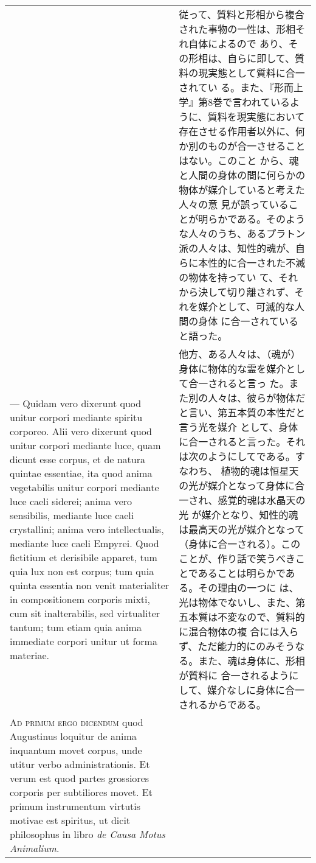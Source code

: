 \documentclass[paper=a4paper,fontsize=10pt,jafontsize=9pt,titlepage]{jlreq}
\begin{document}
\begin{longtable}{p{21em}p{21em}}
&

 従って、質料と形相から複合された事物の一性は、形相それ自体によるので
 あり、その形相は、自らに即して、質料の現実態として質料に合一されてい
 る。また、『形而上学』第8巻で言われているように、質料を現実態において
 存在させる作用者以外に、何か別のものが合一させることはない。このこと
 から、魂と人間の身体の間に何らかの物体が媒介していると考えた人々の意
 見が誤っていることが明らかである。そのような人々のうち、あるプラトン
 派の人々は、知性的魂が、自らに本性的に合一された不滅の物体を持ってい
 て、それから決して切り離されず、それを媒介として、可滅的な人間の身体
 に合一されていると語った。

\\


 --- Quidam vero dixerunt quod unitur corpori mediante spiritu
corporeo. Alii vero dixerunt quod unitur corpori mediante luce, quam
dicunt esse corpus, et de natura quintae essentiae, ita quod anima
vegetabilis unitur corpori mediante luce caeli siderei; anima vero
sensibilis, mediante luce caeli crystallini; anima vero
intellectualis, mediante luce caeli Empyrei. Quod fictitium et
derisibile apparet, tum quia lux non est corpus; tum quia quinta
essentia non venit materialiter in compositionem corporis mixti, cum
sit inalterabilis, sed virtualiter tantum; tum etiam quia anima
immediate corpori unitur ut forma materiae.

&

他方、ある人々は、（魂が）身体に物体的な霊を媒介として合一されると言っ
た。また別の人々は、彼らが物体だと言い、第五本質の本性だと言う光を媒介
として、身体に合一されると言った。それは次のようにしてである。すなわち、
植物的魂は恒星天の光が媒介となって身体に合一され、感覚的魂は水晶天の光
が媒介となり、知性的魂は最高天の光が媒介となって（身体に合一される）。この
ことが、作り話で笑うべきことであることは明らかである。その理由の一つに
は、光は物体でないし、また、第五本質は不変なので、質料的に混合物体の複
合には入らず、ただ能力的にのみそうなる。また、魂は身体に、形相が質料に
合一されるようにして、媒介なしに身体に合一されるからである。
 


\\



{\scshape Ad primum ergo dicendum} quod Augustinus loquitur de anima
inquantum movet corpus, unde utitur verbo administrationis. Et verum
est quod partes grossiores corporis per subtiliores movet. Et primum
instrumentum virtutis motivae est spiritus, ut dicit philosophus in
libro {\itshape de Causa Motus Animalium}.


\end{longtable}
\end{document}
